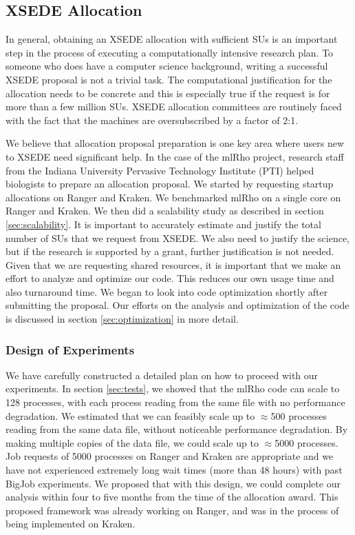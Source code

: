 \documentclass{sig-alternate}
\newcommand{\abhi}[1]{ {\textcolor{red} { ***Abhinav: #1 }}}
\newcommand{\abhi}[1]{ {}}
\begin{document}
\subsection{XSEDE Allocation}

In general, obtaining an XSEDE allocation with sufficient SUs is an important step in the process of executing
a computationally intensive research plan. To someone who does have a computer science background, writing a
successful XSEDE proposal is not a trivial task. The computational justification for the allocation needs to
be concrete and this is especially true if the request is for more than a few million SUs. XSEDE
allocation committees are routinely faced with the fact that the machines are oversubscribed by a factor of 2:1.


We believe that allocation proposal preparation is one key area where users new to XSEDE need significant
help. In the case of the mlRho project, research staff from the Indiana University Pervasive Technology Institute (PTI) helped biologists to prepare an allocation
proposal. We started by requesting startup allocations on Ranger and Kraken. We benchmarked mlRho on a single
core on Ranger and Kraken. We then did a scalability study as described in section \ref{sec:scalability}. It
is important to accurately estimate and justify the total number of SUs that we request from XSEDE.  We also
need to justify the science, but if the research is supported by a grant, further justification is not
needed. Given that we are requesting shared resources, it is important that we make an effort to analyze and
optimize our code. This reduces our own usage time and also turnaround time. We began to look into code
optimization shortly after submitting the proposal. Our efforts on the analysis and optimization of the code
is discussed in section \ref{sec:optimization} in more detail.


\subsubsection{Design of Experiments}

We have carefully constructed a detailed plan on how to proceed with our experiments. In section
\ref{sec:tests}, we showed that the mlRho code can scale to 128 processes, with each process reading from the
same file with no performance degradation. We estimated that we can feasibly scale up to $\approx$500
processes reading from the same data file, without noticeable performance degradation. By making multiple
copies of the data file, we could scale up to $\approx$5000 processes. Job requests of 5000 processes on
Ranger and Kraken are appropriate and we have not experienced extremely long wait times (more than 48 hours) with past BigJob
experiments. We proposed that with this design, we could complete our analysis within four to five months from
the time of the allocation award. This proposed framework was already working on Ranger, and was in the
process of being implemented on Kraken.
\end{document}

